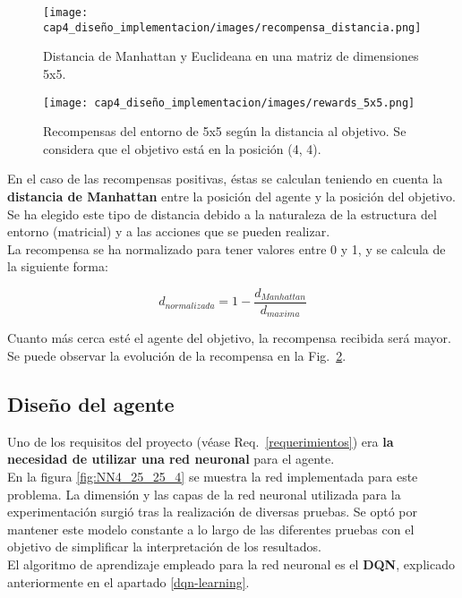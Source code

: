 \begin{figure}
    \centering
    \texttt{[image: cap4\_diseño\_implementacion/images/recompensa\_distancia.png]}
    \caption{Distancia de Manhattan y Euclideana en una matriz de dimensiones 5x5.}
    \label{fig:recompensa_distancia}
\end{figure}

\begin{figure}
    \centering
    \texttt{[image: cap4\_diseño\_implementacion/images/rewards\_5x5.png]}
    \caption{Recompensas del entorno de 5x5 según la distancia al objetivo. Se considera que el objetivo está en la posición (4, 4).}
    \label{fig:rewards_5x5}
\end{figure}

En el caso de las recompensas positivas, éstas se calculan teniendo en cuenta la \textbf{distancia de Manhattan} entre la posición del agente y la posición del objetivo. Se ha elegido este tipo de distancia debido a la naturaleza de la estructura del entorno (matricial) y a las acciones que se pueden realizar. \\

La recompensa se ha normalizado para tener valores entre 0 y 1, y se calcula de la siguiente forma: 

$$ d_{normalizada} = 1 - \frac{d_{Manhattan}} {d_{maxima}}$$


Cuanto más cerca esté el agente del objetivo, la recompensa recibida será mayor. Se puede observar la evolución de la recompensa en la Fig.~\ref{fig:rewards_5x5}.


\subsection{Diseño del agente} \label{diseñoAgente}

Uno de los requisitos del proyecto (véase Req.~\ref{requerimientos}) era \textbf{la necesidad de utilizar una red neuronal} para el agente. \\

En la figura \ref{fig:NN4_25_25_4} se muestra la red implementada para este problema. La dimensión y las capas de la red neuronal utilizada para la experimentación surgió tras la realización de diversas pruebas. Se optó por mantener este modelo constante a lo largo de las diferentes pruebas con el objetivo de simplificar la interpretación de los resultados.\\

El algoritmo de aprendizaje empleado para la red neuronal es el \textbf{DQN}, explicado anteriormente en el apartado \ref{dqn-learning}. 

